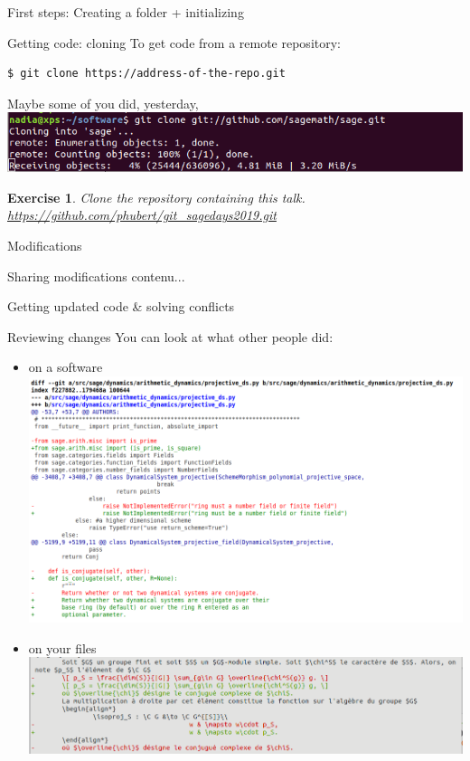 \documentclass{beamer}
\newtheorem{exo}{Exercise}
\begin{document}
	\begin{frame}{First steps: Creating a folder + initializing}

	\end{frame}
	\begin{frame}[fragile]{Getting code: cloning}
	To get code from a remote repository:
	\begin{verbatim}
$ git clone https://address-of-the-repo.git
	\end{verbatim}
	Maybe some of you did, yesterday,
	\includegraphics[width=\linewidth]{clone}
	\pause
	\begin{exo}
		Clone the repository containing this talk.
		\url{https://github.com/phubert/git_sagedays2019.git}
	\end{exo}
	\end{frame}
	\begin{frame}{Modifications}
		
	\end{frame}
	\begin{frame}{Sharing modifications}
		contenu...
	\end{frame}
	\begin{frame}{Getting updated code \& solving conflicts}
	
	\end{frame}
	\begin{frame}{Reviewing changes}
		You can look at what other people did:
		\begin{itemize}
			\item on a software\\
		\includegraphics[width=0.8\linewidth]{diff_on_sage_2}  %
			\item on your files\\
		\includegraphics[width=0.8\linewidth]{diff_on_latex}
		\end{itemize}
	\end{frame}
\end{document}
